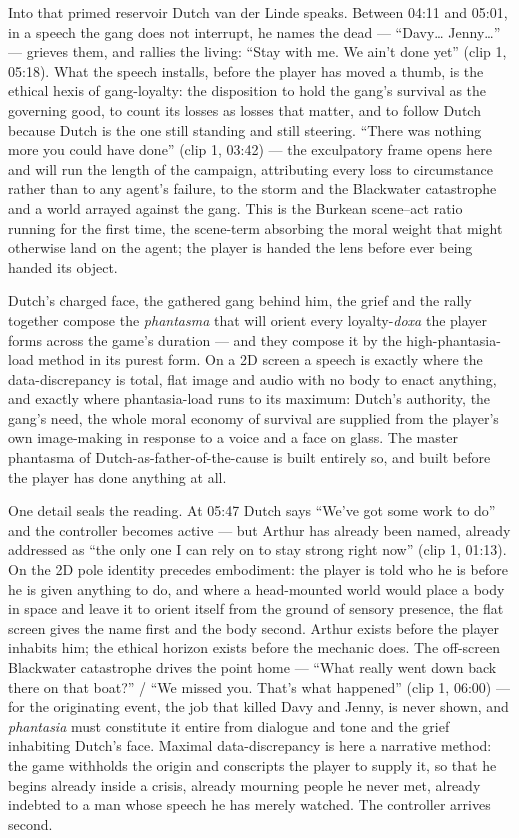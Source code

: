 \documentclass{article}
\begin{document}
Into that primed reservoir Dutch van der Linde speaks. Between 04:11 and 05:01, in a speech the gang does not interrupt, he names the dead — ``Davy… Jenny…'' — grieves them, and rallies the living: ``Stay with me. We ain't done yet'' (clip 1, 05:18). What the speech installs, before the player has moved a thumb, is the ethical hexis of gang-loyalty: the disposition to hold the gang's survival as the governing good, to count its losses as losses that matter, and to follow Dutch because Dutch is the one still standing and still steering. ``There was nothing more you could have done'' (clip 1, 03:42) — the exculpatory frame opens here and will run the length of the campaign, attributing every loss to circumstance rather than to any agent's failure, to the storm and the Blackwater catastrophe and a world arrayed against the gang. This is the Burkean scene–act ratio running for the first time, the scene-term absorbing the moral weight that might otherwise land on the agent; the player is handed the lens before ever being handed its object.

Dutch's charged face, the gathered gang behind him, the grief and the rally together compose the \textit{phantasma} that will orient every loyalty-\textit{doxa} the player forms across the game's duration — and they compose it by the high-phantasia-load method in its purest form. On a 2D screen a speech is exactly where the data-discrepancy is total, flat image and audio with no body to enact anything, and exactly where phantasia-load runs to its maximum: Dutch's authority, the gang's need, the whole moral economy of survival are supplied from the player's own image-making in response to a voice and a face on glass. The master phantasma of Dutch-as-father-of-the-cause is built entirely so, and built before the player has done anything at all.

One detail seals the reading. At 05:47 Dutch says ``We've got some work to do'' and the controller becomes active — but Arthur has already been named, already addressed as ``the only one I can rely on to stay strong right now'' (clip 1, 01:13). On the 2D pole identity precedes embodiment: the player is told who he is before he is given anything to do, and where a head-mounted world would place a body in space and leave it to orient itself from the ground of sensory presence, the flat screen gives the name first and the body second. Arthur exists before the player inhabits him; the ethical horizon exists before the mechanic does. The off-screen Blackwater catastrophe drives the point home — ``What really went down back there on that boat?'' / ``We missed you. That's what happened'' (clip 1, 06:00) — for the originating event, the job that killed Davy and Jenny, is never shown, and \textit{phantasia} must constitute it entire from dialogue and tone and the grief inhabiting Dutch's face. Maximal data-discrepancy is here a narrative method: the game withholds the origin and conscripts the player to supply it, so that he begins already inside a crisis, already mourning people he never met, already indebted to a man whose speech he has merely watched. The controller arrives second.
\end{document}
